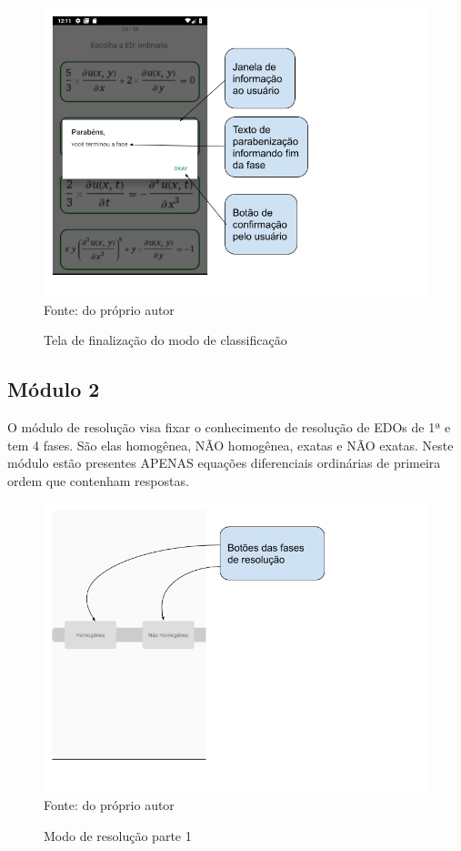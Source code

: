 \begin{figure}[H]
\centering
\caption{Tela de finalização do modo de classificação}
\includegraphics[scale=0.72]{figuras/fim_fase.png}
\small{Fonte: do próprio autor}
\end{figure}

\subsection[Módulo 2]{Módulo 2}

O módulo de resolução visa fixar o conhecimento de resolução de EDOs de 1ª e tem 4 fases. São elas homogênea, NÃO homogênea, exatas e NÃO exatas. Neste módulo estão presentes APENAS equações diferenciais ordinárias de primeira ordem que contenham respostas. 

\begin{figure}[H]
\centering
\caption{Modo de resolução parte 1}
\includegraphics[scale=0.72]{figuras/modo_resolucao_1.png}
\small{Fonte: do próprio autor}
\end{figure}

